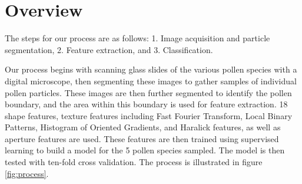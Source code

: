 \section{Overview} 

The steps for our process are as follows: 1. Image acquisition and particle segmentation, 2. Feature extraction, and 3. Classification.

Our process begins with scanning glass slides of the various pollen species with a digital microscope, then segmenting these images to gather samples of individual pollen particles. These images are then further segmented to identify the pollen boundary, and the area within this boundary is used for feature extraction. 18 shape features, texture features including Fast Fourier Transform, Local Binary Patterns, Histogram of Oriented Gradients, and Haralick features, as well as aperture features are used. These features are then trained using supervised learning to build a model for the 5 pollen species sampled. The model is then tested with ten-fold cross validation. The process is illustrated in figure \ref{fig:process}. 
    
    
    
    
    
    
    
    
    
    
    
    
  
  
  
  
  
  
  
  
  
  
  
  
  
  
  
  